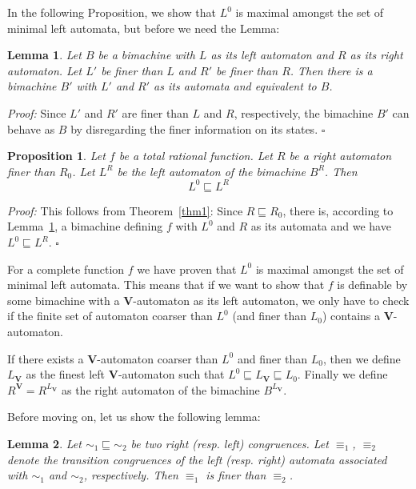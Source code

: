 \documentclass[12pt]{report}
\newtheorem{prp}{Proposition}[section]
\newtheorem{lem}{Lemma}[section]
\theoremstyle{definition}
\theoremstyle{remark}
\newenvironment{prf}
{\textit{Proof:}}
{\hfill $\square$\\}
\begin{document}
In the following Proposition, we show that $L^0$ is maximal amongst the set of minimal left automata, but before we need the Lemma:

\begin{lem}
\label{lem-finer}
Let $B$ be a bimachine with $L$ as its left automaton and $R$ as its right automaton. Let $L'$ be finer than $L$ and $R'$ be finer than $R$. Then there is a bimachine $B'$ with $L'$ and $R'$ as its automata and equivalent to $B$.
\end{lem}

\begin{prf}
Since $L'$ and $R'$ are finer than $L$ and $R$, respectively, the bimachine $B'$ can behave as $B$ by disregarding the finer information on its states.
\end{prf}

\begin{prp}
Let $f$ be a total rational function. Let $R$ be a right automaton finer than $R_0$. Let $L^R$ be the left automaton of the bimachine  $B^R$.
Then $${L^0} \sqsubseteq {L^R}$$
\end{prp}


\begin{prf}
This follows from Theorem~\ref{thm1}: Since ${R} \sqsubseteq {R_0}$, there is, according to Lemma~\ref{lem-finer}, a bimachine defining $f$ with $L^0$ and $R$ as its automata and we have ${L^0} \sqsubseteq {L^R}$.
\end{prf}

For a complete function $f$ we have proven that $L^0$ is maximal amongst the set of minimal left automata.
This means that if we want to show that $f$ is definable by some bimachine with a \textbf V-automaton as its left automaton, we only have to check if the finite set of automaton coarser than $L^0$ (and finer than $L_0$) contains a \textbf V-automaton.

If there exists a \textbf V-automaton coarser than $L^0$ and finer than $L_0$, then we define $L_\mathbf{V}$ as the finest left \textbf V-automaton such that ${L^0} \sqsubseteq {L_\mathbf{V}} \sqsubseteq {L_0}$.
Finally we define $R^\mathbf V=R^{L_\mathbf V}$ as the right automaton of the bimachine $B^{L_\mathbf V}$.

Before moving on, let us show the following lemma:
\begin{lem}
\label{lem_v_c}
Let ${\sim_1}\sqsubseteq {\sim_2}$ be two right (resp. left) congruences.
Let $\equiv_1$, $\equiv_2$ denote the transition congruences of the left (resp. right) automata associated with $\sim_1$ and $\sim_2$, respectively. Then ${\equiv_1}$ is finer than $ {\equiv_2}$.
\end{lem}
\end{document}
